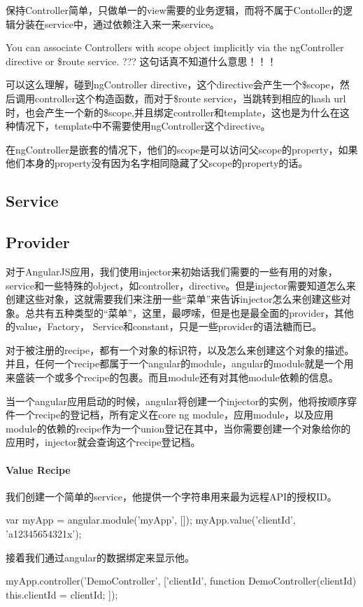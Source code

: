 	  保持Controller简单，只做单一的view需要的业务逻辑，而将不属于Contoller的逻辑分装在service中，通过依赖注入来一来service。
	
	  You can associate Controllers with scope object implicitly via the ngController directive or \$route service. ??? 这句话真不知道什么意思！！！
	
	  可以这么理解，碰到ngController directive，这个directive会产生一个\$scope，然后调用controller这个构造函数，而对于\$route service，当跳转到相应的hash url时，也会产生一个新的\$scope,并且绑定controller和template，这也是为什么在这种情况下，template中不需要使用ngController这个directive。
	
	  在ngController是嵌套的情况下，他们的scope是可以访问父scope的property，如果他们本身的property没有因为名字相同隐藏了父scope的property的话。
	  
	  
	 \subsection{Service}
	 
	 \subsection{Provider}
	 
	 对于AngularJS应用，我们使用injector来初始话我们需要的一些有用的对象，service和一些特殊的object，如controller，directive。但是injector需要知道怎么来创建这些对象，这就需要我们来注册一些``菜单''来告诉injector怎么来创建这些对象。总共有五种类型的``菜单''，这里，最啰嗦，但是也是最全面的provider，其他的value，Factory， Service和constant，只是一些provider的语法糖而已。
	 
	 对于被注册的recipe，都有一个对象的标识符，以及怎么来创建这个对象的描述。并且，任何一个recipe都属于一个angular的module，angular的module就是一个用来盛装一个或多个recipe的包裹。而且module还有对其他module依赖的信息。
	  
	  当一个angular应用启动的时候，angular将创建一个injector的实例，他将按顺序穿件一个recipe的登记档，所有定义在core ng module，应用module，以及应用module的依赖的recipe作为一个union登记在其中，当你需要创建一个对象给你的应用时，injector就会查询这个recipe登记档。
	  
	  \paragraph{Value Recipe}
	  
	  我们创建一个简单的service，他提供一个字符串用来最为远程API的授权ID。
	  \begin{JavaScript}
	var myApp = angular.module('myApp', []);	
	myApp.value('clientId', 'a12345654321x');  
	  \end{JavaScript}
	  接着我们通过angular的数据绑定来显示他。
	  \begin{JavaScript}
	myApp.controller('DemoController', ['clientId', function DemoController(clientId) {
  		this.clientId = clientId;
	}]);
	  \end{JavaScript}
	  
